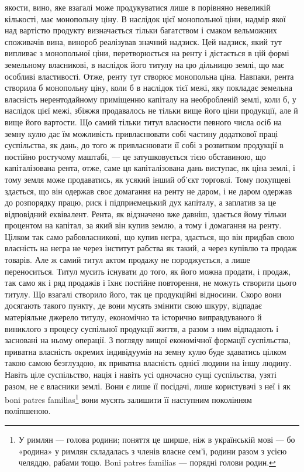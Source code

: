 \parcont{}  %
якости, вино, яке взагалі може продукуватися лише в порівняно невеликій кількості,
має монопольну ціну. В наслідок цієї монопольної ціни, надмір якої над вартістю
продукту визначається тільки багатством і смаком вельможних споживачів вина,
винороб реалізував значний надзиск. Цей надзиск, який тут випливає з монопольної
ціни, перетворюється на ренту і дістається в цій формі земельному власникові, в
наслідок його титулу на цю дільницю землі, що має особливі властивості. Отже,
ренту тут створює монопольна ціна. Навпаки, рента створила б монопольну ціну,
коли б в наслідок тієї межі, яку покладає земельна власність нерентодайному приміщенню
капіталу на необробленій землі, коли б, у наслідок цієї межі, збіжжя продавалось
не тільки вище його ціни продукції, але й вище його вартости. Що самий
тільки титул власности певного числа осіб на земну кулю дає їм можливість привласнювати
собі частину додаткової праці суспільства, як дань, до того ж привласнювати
її собі з розвитком продукції в постійно ростучому маштабі, — це затушковується
тією обставиною, що капіталізована рента, отже, саме ця капіталізована
дань виступає, як ціна землі, і тому земля може продаватись, як усякий інший
об’єкт торговлі. Тому покупцеві здається, що він одержав своє домагання на ренту
не даром, і не даром одержав до розпорядку працю, риск і підприємецький дух
капіталу, а заплатив за це відповідний еквівалент. Рента, як відзначено вже
давніш, здається йому тільки процентом на капітал, за який він купив землю,
а тому і домагання на ренту. Цілком так само рабовласникові, що купив негра,
здається, що він придбав свою власність на негра не через інститут рабства
як такий, а через купівлю та продаж товарів. Але ж самий титул актом продажу
не породжується, а лише переноситься. Титул мусить існувати до того,
як його можна продати, і продаж, так само як і ряд продажів і їхнє постійне
повторення, не можуть створити цього титулу. Що взагалі створило його, так
це продукційні відносини. Скоро вони досягають такого пункту, де вони мусять
змінити свою шкуру, відпадає матеріяльне джерело титулу, економічно
та історично виправдуваного й виниклого з процесу суспільної продукції
життя, а разом з ним відпадають і засновані на ньому операції. З погляду
вищої економічної формації суспільства, приватна власність окремих індивідуумів
на земну кулю буде здаватись цілком такою самою безглуздою, як приватна
власність однієї людини на іншу людину. Навіть ціле суспільство, нація
і навіть усі одночасно сущі суспільства, узяті разом, не є власники землі. Вони є
лише її посідачі, лише користувачі з неї і як boni patres familias\footnote*{
У римлян — голова родини; поняття це ширше, ніж в українській мові — бо
«родина» у римлян складалась з членів власне сем’ї, родини разом з усією челяддю, рабами тощо. Boni
patres familias — порядні голови родин. 
} вони мусять залишити її наступним поколінням поліпшеною.

